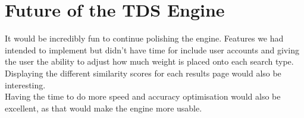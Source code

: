 \section{Future of the TDS Engine}
It would be incredibly fun to continue polishing the engine. Features we had intended to implement but didn't have time for include user accounts and giving the user the ability to adjust how much weight is placed onto each search type. Displaying the different similarity scores for each results page would also be interesting. \\
Having the time to do more speed and accuracy optimisation would also be excellent, as that would make the engine more usable. 
